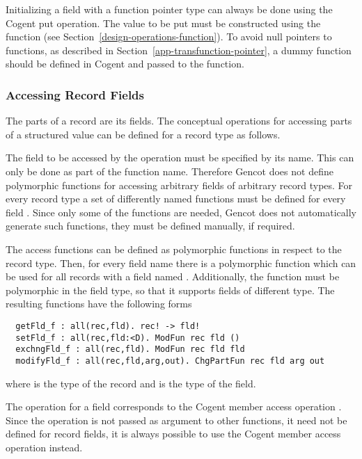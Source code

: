 Initializing a field  with a function pointer type  can always be done using the Cogent put operation.
The value to be put must be constructed using the function  (see Section~\ref{design-operations-function}). To
avoid null pointers to functions, as described in Section~\ref{app-transfunction-pointer}, a dummy function should be defined in
Cogent and passed to the  function.

\subsubsection{Accessing Record Fields}

The parts of a record are its fields. The conceptual operations for accessing parts of a structured value can be defined for a record type 
 as follows.

The field to be accessed by the operation must be specified by its name. This can only be done as part of the function name.
Therefore Gencot does not define polymorphic functions for accessing arbitrary fields of arbitrary record types. For every record type
 a set of differently named functions must be defined for every field . Since only some of the functions are needed, Gencot
does not automatically generate such functions, they must be defined manually, if required.

The access functions can be defined as polymorphic functions in respect to the record type. Then, for every field name
 there is a polymorphic function which can be used for all records with a field named . Additionally, the
function must be polymorphic in the field type, so that it supports fields of different type. The resulting 
functions have the following forms
\begin{verbatim}
  getFld_f : all(rec,fld). rec! -> fld!
  setFld_f : all(rec,fld:<D). ModFun rec fld ()
  exchngFld_f : all(rec,fld). ModFun rec fld fld
  modifyFld_f : all(rec,fld,arg,out). ChgPartFun rec fld arg out
\end{verbatim}
where  is the type of the record and  is the type of the field.

The operation  for a field  corresponds to the Cogent member access operation .
Since the  operation is not passed as argument to other functions, it need not be defined for record fields, it is always possible
to use the Cogent member access operation instead.

